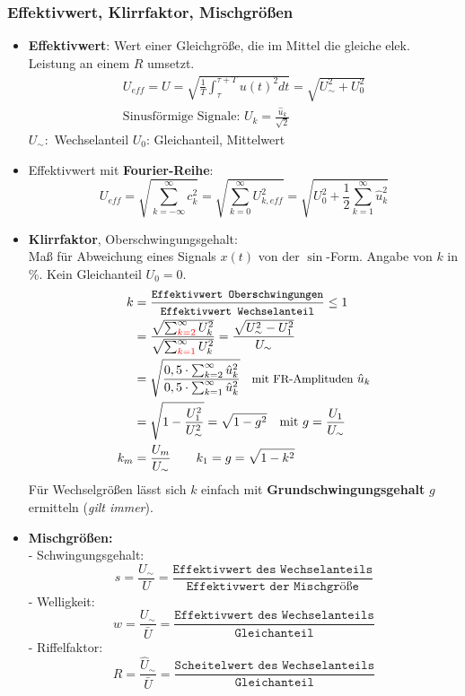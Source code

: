 \subsubsection{Effektivwert, Klirrfaktor, Mischgrößen}
\begin{itemize}
	\item \textbf{Effektivwert}:
	{\small Wert einer Gleichgröße, die im Mittel die gleiche elek. Leistung an einem $R$ umsetzt.}
\begin{gather*}
		      U_{\mathit{eff}} = U = \sqrt{\frac{1}{T} \int_\tau^{\tau+T} u(t)^2 dt} = \sqrt{U_{\sim}^2+U_{0}^2}\\
		      \text{Sinusf\"ormige Signale: }U_k = \frac{\hat{u}_k}{\sqrt{2}}
\end{gather*}
$U_\sim:$ Wechselanteil \quad $U_0$: Gleichanteil, Mittelwert
 	\item Effektivwert mit \textbf{Fourier-Reihe}:\\
		  $$ U_{\mathit{eff}} = \sqrt{\sum_{k=-\infty}^{\infty} c_k^2} = \sqrt{\sum_{k=0}^{\infty}U_{k,\mathit{eff}}^2} = \sqrt{U_0^2 + \frac{1}{2} \sum_{k=1}^{\infty} \hat{u}_k^2}$$
	\item \textbf{Klirrfaktor}, Oberschwingungsgehalt:\\
	      {\small Maß für Abweichung eines Signals $x(t)$ von der $\sin$-Form. Angabe von $k$ in \%. Kein Gleichanteil $U_0=0$.}
	      \begin{align*}
		      k & = \frac{\texttt{\small Effektivwert  Oberschwingungen}}{\texttt{\small Effektivwert Wechselanteil}}\leq 1\\
		        & = \frac{\sqrt{\sum_{{\color{red}{k=2}}}^{\infty} U_{k}^{2}}}{\sqrt{\sum_{{\color{red}{k=1}}}^{\infty} U_{k}^{2}}} = \frac{\sqrt{U_\sim^2 - U_1^2}}{U_\sim} \\
		        & = \sqrt{\frac{0,5 \cdot \sum_{k=2}^{\infty}\hat{u}_k^2}{0,5 \cdot \sum_{k=1}^{\infty}\hat{u}_k^2}} \text{\small \quad mit FR-Amplituden } \hat{u}_k\\
		        & = \sqrt{1-\frac{U_1^2}{U_\sim^2}} = \sqrt{1-g^2} \quad \text{mit } g = \frac{U_1}{U_\sim}\\
		      k_m &= \frac{U_m}{U_\sim} \qquad k_1 = g = \sqrt{1-k^2}
	      \end{align*}
{\small Für Wechselgrößen lässt sich $k$ einfach mit \textbf{Grundschwingungsgehalt} $g$ ermitteln (\textit{gilt immer}).}
	\item \textbf{Mischgrößen:}\\
	      - Schwingungsgehalt:
	      \[
		      s = \frac{U_\sim}{U} = \frac{\texttt{Effektivwert des Wechselanteils}}{\texttt{Effektivwert der Mischgröße}}
	      \]
	      - Welligkeit:
	      \[
		      w = \frac{U_\sim}{\bar{U}} = \frac{\texttt{Effektivwert des Wechselanteils}}{\texttt{Gleichanteil}}
	      \]
	      - Riffelfaktor:
	      \[
		      R = \frac{\hat{U}_\sim}{\bar{U}} = \frac{\texttt{Scheitelwert des Wechselanteils}}{\texttt{Gleichanteil}}
	      \]
\end{itemize}
